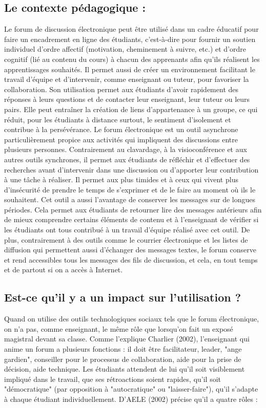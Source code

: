 \documentclass[12pt,a4paper,titlepage]{article}
\begin{document}
\subsection{Le contexte pédagogique :}
Le forum de discussion électronique peut être utilisé dans un cadre éducatif pour faire
un encadrement en ligne des étudiants, c'est-à-dire pour fournir un soutien individuel d'ordre
affectif (motivation, cheminement à suivre, etc.) et d'ordre cognitif (lié au contenu du cours) à
chacun des apprenants afin qu'ils réalisent les apprentissages souhaités. Il permet aussi de créer
un environnement facilitant le travail d'équipe et d'intervenir, comme enseignant ou tuteur, pour
favoriser la collaboration. Son utilisation permet aux étudiants d'avoir rapidement des réponses
à leurs questions et de contacter leur enseignant, leur tuteur ou leurs pairs. Elle peut entraîner
la création de liens d'appartenance à un groupe, ce qui réduit, pour les étudiants à distance
surtout, le sentiment d'isolement et contribue à la persévérance.\newline
Le forum électronique est un outil asynchrone particulièrement propice aux activités qui
impliquent des discussions entre plusieurs personnes. Contrairement au clavardage, à la
visioconférence et aux autres outils synchrones, il permet aux étudiants de réfléchir et
d’effectuer des recherches avant d'intervenir dans une discussion ou d'apporter leur contribution
à une tâche à réaliser. Il permet aux plus timides et à ceux qui vivent plus d'insécurité de prendre
le temps de s'exprimer et de le faire au moment où ils le souhaitent. Cet outil a aussi l'avantage
de conserver les messages sur de longues périodes. Cela permet aux étudiants de retourner lire
des messages antérieurs afin de mieux comprendre certains éléments de contenu et à
l'enseignant de vérifier si les étudiants ont tous contribué à un travail d'équipe réalisé avec cet
outil. De plus, contrairement à des outils comme le courrier électronique et les listes de diffusion
qui permettent aussi d'échanger des messages textes, le forum conserve et rend accessibles tous
les messages des fils de discussion, et cela, en tout temps et de partout si on a accès à Internet.\newline
\subsection{Est-ce qu’il y a un impact sur l’utilisation ?}
Quand on utilise des outils technologiques sociaux tels que le forum électronique, on
n'a pas, comme enseignant, le même rôle que lorsqu'on fait un exposé magistral devant sa
classe. Comme l'explique Charlier (2002), l'enseignant qui anime un forum a plusieurs fonctions : il doit être facilitateur, leader, "ange gardien", conseiller pour le processus de
collaboration, aide pour la prise de décision, aide technique. Les étudiants attendent de lui qu'il
soit visiblement impliqué dans le travail, que ses rétroactions soient rapides, qu'il soit
"démocratique" (par opposition à "autocratique" ou "laisser-faire"), qu'il s'adapte à chaque
étudiant individuellement. D’AELE (2002) précise qu'il a quatre rôles :
 
\end{document}
